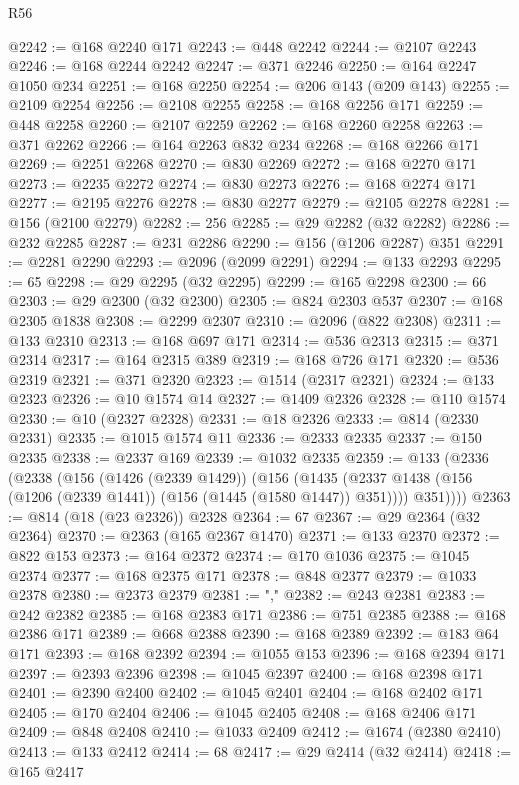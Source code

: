 \begin{lexlean}{R56}
\begin{coremodule}
@2242 := @168 @2240 @171
@2243 := @448 @2242
@2244 := @2107 @2243
@2246 := @168 @2244 @2242
@2247 := @371 @2246
@2250 := @164 @2247 @1050 @234
@2251 := @168 @2250
@2254 := @206 @143 (@209 @143)
@2255 := @2109 @2254
@2256 := @2108 @2255
@2258 := @168 @2256 @171
@2259 := @448 @2258
@2260 := @2107 @2259
@2262 := @168 @2260 @2258
@2263 := @371 @2262
@2266 := @164 @2263 @832 @234
@2268 := @168 @2266 @171
@2269 := @2251 @2268
@2270 := @830 @2269
@2272 := @168 @2270 @171
@2273 := @2235 @2272
@2274 := @830 @2273
@2276 := @168 @2274 @171
@2277 := @2195 @2276
@2278 := @830 @2277
@2279 := @2105 @2278
@2281 := @156 (@2100 @2279)
@2282 := 256
@2285 := @29 @2282 (@32 @2282)
@2286 := @232 @2285
@2287 := @231 @2286
@2290 := @156 (@1206 @2287) @351
@2291 := @2281 @2290
@2293 := @2096 (@2099 @2291)
@2294 := @133 @2293
@2295 := 65
@2298 := @29 @2295 (@32 @2295)
@2299 := @165 @2298
@2300 := 66
@2303 := @29 @2300 (@32 @2300)
@2305 := @824 @2303 @537
@2307 := @168 @2305 @1838
@2308 := @2299 @2307
@2310 := @2096 (@822 @2308)
@2311 := @133 @2310
@2313 := @168 @697 @171
@2314 := @536 @2313
@2315 := @371 @2314
@2317 := @164 @2315 @389
@2319 := @168 @726 @171
@2320 := @536 @2319
@2321 := @371 @2320
@2323 := @1514 (@2317 @2321)
@2324 := @133 @2323
@2326 := @10 @1574 @14
@2327 := @1409 @2326
@2328 := @110 @1574
@2330 := @10 (@2327 @2328)
@2331 := @18 @2326
@2333 := @814 (@2330 @2331)
@2335 := @1015 @1574 @11
@2336 := @2333 @2335
@2337 := @150 @2335
@2338 := @2337 @169
@2339 := @1032 @2335
@2359 := @133
    (@2336
      (@2338
        (@156
          (@1426 (@2339 @1429))
          (@156
            (@1435 (@2337 @1438 (@156 (@1206 (@2339 @1441)) (@156 (@1445 (@1580 @1447)) @351))))
            @351))))
@2363 := @814 (@18 (@23 @2326)) @2328
@2364 := 67
@2367 := @29 @2364 (@32 @2364)
@2370 := @2363 (@165 @2367 @1470)
@2371 := @133 @2370
@2372 := @822 @153
@2373 := @164 @2372
@2374 := @170 @1036
@2375 := @1045 @2374
@2377 := @168 @2375 @171
@2378 := @848 @2377
@2379 := @1033 @2378
@2380 := @2373 @2379
@2381 := ","
@2382 := @243 @2381
@2383 := @242 @2382
@2385 := @168 @2383 @171
@2386 := @751 @2385
@2388 := @168 @2386 @171
@2389 := @668 @2388
@2390 := @168 @2389
@2392 := @183 @64 @171
@2393 := @168 @2392
@2394 := @1055 @153
@2396 := @168 @2394 @171
@2397 := @2393 @2396
@2398 := @1045 @2397
@2400 := @168 @2398 @171
@2401 := @2390 @2400
@2402 := @1045 @2401
@2404 := @168 @2402 @171
@2405 := @170 @2404
@2406 := @1045 @2405
@2408 := @168 @2406 @171
@2409 := @848 @2408
@2410 := @1033 @2409
@2412 := @1674 (@2380 @2410)
@2413 := @133 @2412
@2414 := 68
@2417 := @29 @2414 (@32 @2414)
@2418 := @165 @2417

\end{coremodule}
\end{lexlean}
